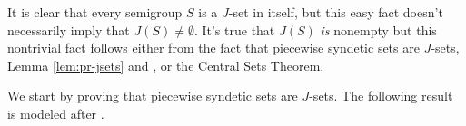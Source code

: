 It is clear that every semigroup $S$ is a $J$-set in itself, but this easy fact doesn't necessarily imply that $J(S) \ne \emptyset$.
It's true that $J(S)$ \emph{is} nonempty but this nontrivial fact follows either from the fact that piecewise syndetic sets are $J$-sets, Lemma \ref{lem:pr-jsets} and \cite[Theorem 3.11]{Hindman:1998fk}, or the Central Sets Theorem.%

We start by proving that piecewise syndetic sets are $J$-sets.
The following result is modeled after \cite[Theorems 14.1 and 14.7]{Hindman:1998fk}. 

